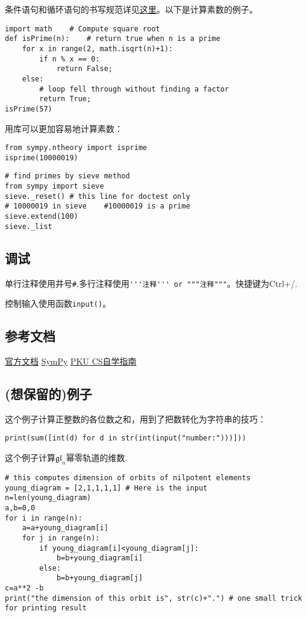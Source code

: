 \documentclass[11pt]{amsart}
\begin{document}
条件语句和循环语句的书写规范详见\href{https://docs.python.org/3/tutorial/controlflow.html}{这里}。以下是计算素数的例子。
\begin{lstlisting}[language=iPython]
import math    # Compute square root
def isPrime(n):    # return true when n is a prime
    for x in range(2, math.isqrt(n)+1):
        if n % x == 0:
            return False;
    else:
        # loop fell through without finding a factor
        return True;
isPrime(57)
\end{lstlisting}
用库可以更加容易地计算素数：
\begin{lstlisting}[language=iPython]
from sympy.ntheory import isprime
isprime(10000019)
\end{lstlisting}
\begin{lstlisting}[language=iPython]
# find primes by sieve method
from sympy import sieve
sieve._reset() # this line for doctest only
# 10000019 in sieve    #10000019 is a prime
sieve.extend(100)
sieve._list
\end{lstlisting}
\subsection{调试}
单行注释使用井号\lstinline|#|,多行注释使用\lstinline|'''注释''' or """注释"""|。快捷键为Ctrl+/.

控制输入使用函数\lstinline|input()|。

\subsection{参考文档}
\href{https://docs.python.org/zh-cn/3/tutorial/index.html}{官方文档}
\href{https://docs.sympy.org/latest/tutorial/index.html#tutorial}{SymPy}
\href{https://pkuflyingpig.github.io/pku-cs-self-learning/}{PKU CS自学指南}
\subsection{(想保留的)例子}
这个例子计算正整数的各位数之和，用到了把数转化为字符串的技巧：
\begin{lstlisting}[language=iPython]
print(sum([int(d) for d in str(int(input("number:")))]))
\end{lstlisting}
这个例子计算$\mathfrak{gl}_n$幂零轨道的维数.
\begin{lstlisting}[language=iPython]
# this computes dimension of orbits of nilpotent elements
young_diagram = [2,1,1,1,1] # Here is the input
n=len(young_diagram)
a,b=0,0
for i in range(n):
    a=a+young_diagram[i]
    for j in range(n):
        if young_diagram[i]<young_diagram[j]:
            b=b+young_diagram[i]
        else:
            b=b+young_diagram[j]
c=a**2 -b
print("the dimension of this orbit is", str(c)+".") # one small trick for printing result
\end{lstlisting}
\end{document}
